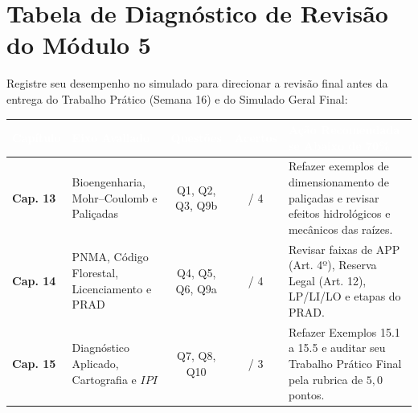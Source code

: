 \section*{Tabela de Diagnóstico de Revisão do Módulo 5}

Registre seu desempenho no simulado para direcionar a revisão final antes da entrega do Trabalho Prático (Semana 16) e do Simulado Geral Final:

\begin{center}
\renewcommand{\arraystretch}{1.35}
\small
\begin{tabularx}{\textwidth}{@{}p{2.2cm} p{4.2cm} c c >{\raggedright\arraybackslash}X@{}}
  \toprule
  \rowcolor{uefsNavy}
  \textcolor{white}{\bfseries Capítulo} & \textcolor{white}{\bfseries Eixo Avaliado} & \textcolor{white}{\bfseries Questões} & \textcolor{white}{\bfseries Acertos} & \textcolor{white}{\bfseries Ação Recomendada se Abaixo de 70\%} \\
  \midrule
  \textbf{Cap. 13} & Bioengenharia, Mohr--Coulomb e Paliçadas & Q1, Q2, Q3, Q9b & \quad / 4 & Refazer exemplos de dimensionamento de paliçadas e revisar efeitos hidrológicos e mecânicos das raízes. \\
  \rowcolor{bgGray}
  \textbf{Cap. 14} & PNMA, Código Florestal, Licenciamento e PRAD & Q4, Q5, Q6, Q9a & \quad / 4 & Revisar faixas de APP (Art. 4º), Reserva Legal (Art. 12), LP/LI/LO e etapas do PRAD. \\
  \textbf{Cap. 15} & Diagnóstico Aplicado, Cartografia e $IPI$ & Q7, Q8, Q10 & \quad / 3 & Refazer Exemplos 15.1 a 15.5 e auditar seu Trabalho Prático Final pela rubrica de $5{,}0$ pontos. \\
  \bottomrule
\end{tabularx}
\end{center}
